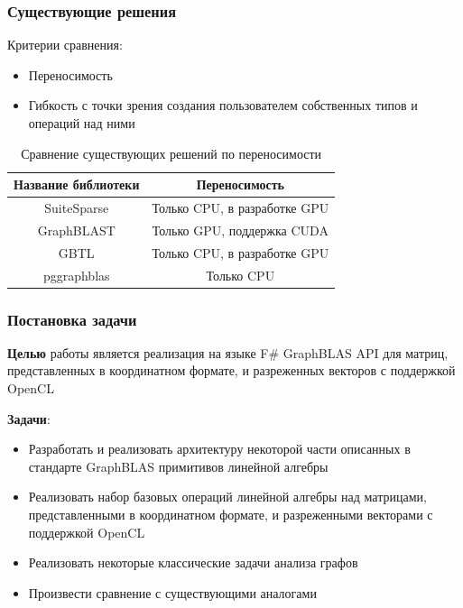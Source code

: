 \documentclass{beamer}
\begin{document}
\begin{frame}  
  \frametitle{Существующие решения}
  
  Критерии сравнения:
  \begin{itemize}
    \item Переносимость
    \item Гибкость с точки зрения создания пользователем собственных типов и операций над ними
  \end{itemize}
  
  \begin{table}
  \begin{tabular}{c | c}
  Название библиотеки & Переносимость \\
  \hline
  SuiteSparse & Только CPU, в разработке GPU \\ 
  GraphBLAST & Только GPU, поддержка CUDA \\
  GBTL & Только CPU, в разработке GPU \\
  pggraphblas & Только CPU 
  \end{tabular}
  \caption{Сравнение существующих решений по переносимости}
  \end{table}
  
\end{frame}

\begin{frame}
  \frametitle{Постановка задачи}
  \textbf{Целью} работы является реализация на языке F\# GraphBLAS API для матриц, представленных в координатном формате, и разреженных векторов с поддержкой OpenCL

  \textbf{Задачи}:
  \begin{itemize}
    \item Разработать и реализовать архитектуру некоторой части описанных в стандарте GraphBLAS примитивов линейной алгебры
    \item Реализовать набор базовых операций линейной алгебры над матрицами, представленными в координатном формате, и разреженными векторами с поддержкой OpenCL
    \item Реализовать некоторые классические задачи анализа графов
    \item Произвести сравнение с существующими аналогами
  \end{itemize}
\end{frame}
\end{document}
